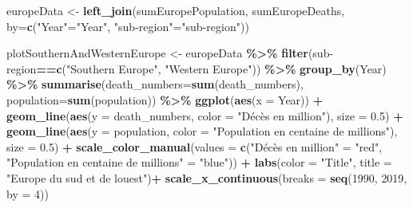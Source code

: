 \documentclass[
]{article}
\newenvironment{Shaded}{\begin{snugshade}}{\end{snugshade}}
\newcommand{\AttributeTok}[1]{\textcolor[rgb]{0.13,0.29,0.53}{#1}}
\newcommand{\DecValTok}[1]{\textcolor[rgb]{0.00,0.00,0.81}{#1}}
\newcommand{\FloatTok}[1]{\textcolor[rgb]{0.00,0.00,0.81}{#1}}
\newcommand{\FunctionTok}[1]{\textcolor[rgb]{0.13,0.29,0.53}{\textbf{#1}}}
\newcommand{\NormalTok}[1]{#1}
\newcommand{\OtherTok}[1]{\textcolor[rgb]{0.56,0.35,0.01}{#1}}
\newcommand{\SpecialCharTok}[1]{\textcolor[rgb]{0.81,0.36,0.00}{\textbf{#1}}}
\newcommand{\StringTok}[1]{\textcolor[rgb]{0.31,0.60,0.02}{#1}}
\begin{document}
\begin{Shaded}
\begin{Highlighting}[]
\NormalTok{europeData }\OtherTok{\textless{}{-}} \FunctionTok{left\_join}\NormalTok{(sumEuropePopulation, sumEuropeDeaths, }\AttributeTok{by=}\FunctionTok{c}\NormalTok{(}\StringTok{"Year"}\OtherTok{=}\StringTok{"Year"}\NormalTok{, }\StringTok{"sub{-}region"}\OtherTok{=}\StringTok{"sub{-}region"}\NormalTok{))}

\NormalTok{plotSouthernAndWesternEurope }\OtherTok{\textless{}{-}}\NormalTok{ europeData }\SpecialCharTok{\%\textgreater{}\%}
  \FunctionTok{filter}\NormalTok{(}\StringTok{\textasciigrave{}}\AttributeTok{sub{-}region}\StringTok{\textasciigrave{}}\SpecialCharTok{==}\FunctionTok{c}\NormalTok{(}\StringTok{"Southern Europe"}\NormalTok{, }\StringTok{"Western Europe"}\NormalTok{)) }\SpecialCharTok{\%\textgreater{}\%}
  \FunctionTok{group\_by}\NormalTok{(Year) }\SpecialCharTok{\%\textgreater{}\%}
  \FunctionTok{summarise}\NormalTok{(}\AttributeTok{death\_numbers=}\FunctionTok{sum}\NormalTok{(death\_numbers), }\AttributeTok{population=}\FunctionTok{sum}\NormalTok{(population)) }\SpecialCharTok{\%\textgreater{}\%}
  \FunctionTok{ggplot}\NormalTok{(}\FunctionTok{aes}\NormalTok{(}\AttributeTok{x =}\NormalTok{ Year)) }\SpecialCharTok{+} 
  \FunctionTok{geom\_line}\NormalTok{(}\FunctionTok{aes}\NormalTok{(}\AttributeTok{y =}\NormalTok{ death\_numbers, }\AttributeTok{color =} \StringTok{"Décès en million"}\NormalTok{), }\AttributeTok{size =} \FloatTok{0.5}\NormalTok{) }\SpecialCharTok{+}
  \FunctionTok{geom\_line}\NormalTok{(}\FunctionTok{aes}\NormalTok{(}\AttributeTok{y =}\NormalTok{ population, }\AttributeTok{color =} \StringTok{"Population en centaine de millions"}\NormalTok{), }\AttributeTok{size =} \FloatTok{0.5}\NormalTok{) }\SpecialCharTok{+}
  \FunctionTok{scale\_color\_manual}\NormalTok{(}\AttributeTok{values =} \FunctionTok{c}\NormalTok{(}\StringTok{"Décès en million"} \OtherTok{=} \StringTok{"red"}\NormalTok{, }\StringTok{"Population en centaine de millions"} \OtherTok{=} \StringTok{"blue"}\NormalTok{)) }\SpecialCharTok{+}
  \FunctionTok{labs}\NormalTok{(}\AttributeTok{color =} \StringTok{"Title"}\NormalTok{, }\AttributeTok{title =} \StringTok{"Europe du sud et de l\textquotesingle{}ouest"}\NormalTok{)}\SpecialCharTok{+}
  \FunctionTok{scale\_x\_continuous}\NormalTok{(}\AttributeTok{breaks =} \FunctionTok{seq}\NormalTok{(}\DecValTok{1990}\NormalTok{, }\DecValTok{2019}\NormalTok{, }\AttributeTok{by =} \DecValTok{4}\NormalTok{))}


\end{Highlighting}
\end{Shaded}
\end{document}
